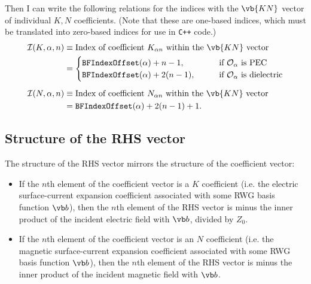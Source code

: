 Then I can write the following relations for the indices 
with the $\vb{KN}$ vector of individual $K, N$ coefficients.
(Note that these are one-based indices, which must be translated
into zero-based indices for use in \texttt{C++} code.)
\begin{align*}
\mathcal{I}(K, \alpha, n)
&\equiv \text{Index of coefficient $K_{\alpha n}$
              within the $\vb{KN}$ vector}
\\
&=\begin{cases}
   \texttt{BFIndexOffset}(\alpha) + n-1, 
   \qquad &\text{if $\mathcal{O}_\alpha$ is PEC} \\
   \texttt{BFIndexOffset}(\alpha) + 2(n-1),
   \qquad &\text{if $\mathcal{O}_\alpha$ is dielectric}
  \end{cases}
\\[5pt]
\mathcal{I}(N, \alpha, n)
&\equiv \text{Index of coefficient $N_{\alpha n}$ 
              within the $\vb{KN}$ vector}
\\
&=\texttt{BFIndexOffset}(\alpha) + 2(n-1)+1.
\end{align*}

\subsection{Structure of the RHS vector}

The structure of the RHS vector mirrors the structure of 
the coefficient vector: 

\begin{itemize}
 \item If the $n$th element of the coefficient vector is a $K$ 
       coefficient (i.e. the electric surface-current expansion 
       coefficient associated with some RWG basis function $\vb b$), 
       then the $n$th element of the RHS vector is minus the 
       inner product of the incident electric field with $\vb b$,
       divided by $Z_0$.
 \item If the $n$th element of the coefficient vector is an $N$ 
       coefficient (i.e. the magnetic surface-current expansion 
       coefficient associated with some RWG basis function $\vb b$),
       then the $n$th element of the RHS vector is minus the 
       inner product of the incident magnetic field with $\vb b$.
\end{itemize}

